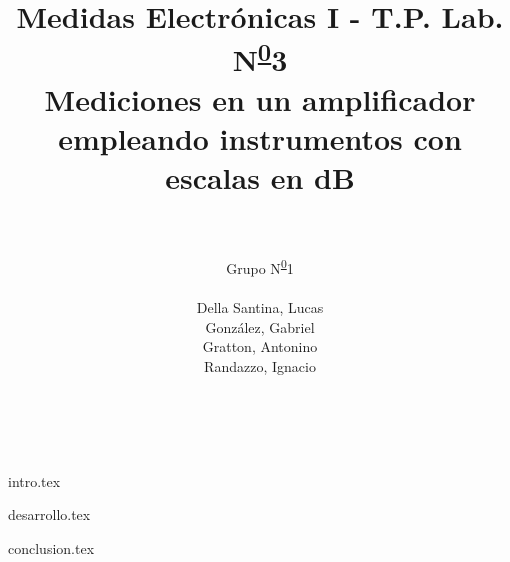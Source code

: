 

\title{ Medidas Electrónicas I - T.P. Lab. N\textsuperscript{\underline{0}}3\\
	Mediciones en un amplificador empleando instrumentos con escalas en dB}
\author{
	\\~\\
	Grupo N\textsuperscript{\underline{0}}1
	\\~\\
	Della Santina, Lucas \\
	González, Gabriel \\
	Gratton, Antonino \\
	Randazzo, Ignacio \\
	\\~\\
}


\maketitle
\tableofcontents

{intro.tex}

{desarrollo.tex}

{conclusion.tex}


